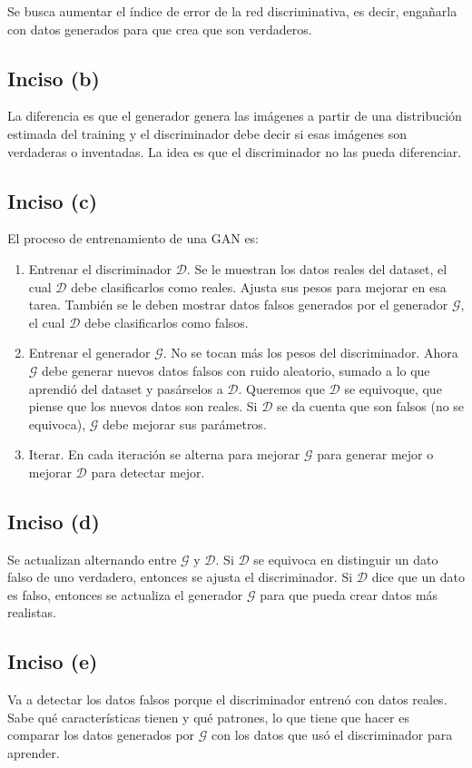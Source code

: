 \documentclass[12pt, a4paper]{article}
\begin{document}
            \noindent Se busca aumentar el índice de error de la red discriminativa, es decir, engañarla con datos generados para que crea que son verdaderos.
        \subsection*{Inciso (b)}
            \noindent La diferencia es que el generador genera las imágenes a partir de una distribución estimada del training y el discriminador debe decir si esas imágenes son verdaderas o inventadas. La idea es que el discriminador no las pueda diferenciar.
        \subsection*{Inciso (c)}
            \noindent El proceso de entrenamiento de una GAN es:
            \begin{enumerate}
                \item Entrenar el discriminador $\mathcal{D}$. Se le muestran los datos reales del dataset, el cual $\mathcal{D}$ debe clasificarlos como reales. Ajusta sus pesos para mejorar en esa tarea. También se le deben mostrar datos falsos generados por el generador $\mathcal{G}$, el cual $\mathcal{D}$ debe clasificarlos como falsos.
                \item Entrenar el generador $\mathcal{G}$. No se tocan más los pesos del discriminador. Ahora $\mathcal{G}$ debe generar nuevos datos falsos con ruido aleatorio, sumado a lo que aprendió del dataset y pasárselos a $\mathcal{D}$. Queremos que $\mathcal{D}$ se equivoque, que piense que los nuevos datos son reales. Si $\mathcal{D}$ se da cuenta que son falsos (no se equivoca), $\mathcal{G}$ debe mejorar sus parámetros.
                \item Iterar. En cada iteración se alterna para mejorar $\mathcal{G}$ para generar mejor o mejorar $\mathcal{D}$ para detectar mejor.
            \end{enumerate}
        \subsection*{Inciso (d)}
            \noindent Se actualizan alternando entre $\mathcal{G}$ y $\mathcal{D}$. Si $\mathcal{D}$ se equivoca en distinguir un dato falso de uno verdadero, entonces se ajusta el discriminador. Si $\mathcal{D}$ dice que un dato es falso, entonces se actualiza el generador $\mathcal{G}$ para que pueda crear datos más realistas.
        \subsection*{Inciso (e)}
            \noindent Va a detectar los datos falsos porque el discriminador entrenó con datos reales. Sabe qué características tienen y qué patrones, lo que tiene que hacer es comparar los datos generados por $\mathcal{G}$ con los datos que usó el discriminador para aprender.
\end{document}
